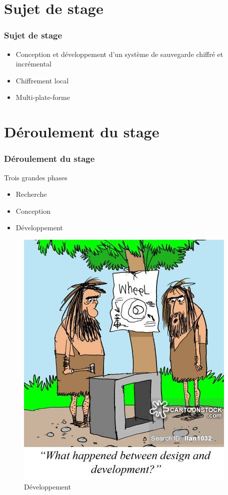 \documentclass{beamer}
\begin{document}
\section{Sujet de stage}
\begin{frame}
 \frametitle{Sujet de stage}
 \begin{itemize}
  \item Conception et d\'eveloppement d'un syst\`eme de sauvegarde 
  chiffr\'e et incr\'emental
  \item Chiffrement local
  \item Multi-plate-forme
 \end{itemize}
\end{frame}

\section{D\'eroulement du stage}
\begin{frame}
 \frametitle{D\'eroulement du stage}
  \begin{minipage}{0.4\textwidth}
    Trois grandes phases
    \begin{itemize}
      \item Recherche
      \item Conception
      \item D\'eveloppement
    \end{itemize}
  \end{minipage}
  \begin{minipage}{0.4\textwidth}
    \begin{figure}[h!]
      \centering
      \includegraphics[scale=0.23]{presentation/designAndDevelopment.jpeg}
      \caption{Développement}
    \end{figure}
  \end{minipage}
\end{frame}
\end{document}
